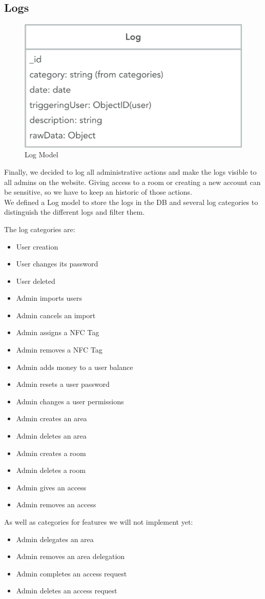\documentclass[11pt,a4paper]{report}
\begin{document}
\subsection{Logs}
\begin{figure}[H]
\begin{center}
	\includegraphics[width=.6\textwidth]{assets/log_model}
	\caption{Log Model}
\end{center}
\end{figure}
Finally, we decided to log all administrative actions and make the logs visible to all admins on the website. Giving access to a room or creating a new account can be sensitive, so we have to keep an historic of those actions.\\

We defined a Log model to store the logs in the DB and several log categories to distinguish the different logs and filter them.

The log categories are:
\begin{itemize}
\item User creation
\item User changes its password
\item User deleted
\item Admin imports users
\item Admin cancels an import
\item Admin assigns a NFC Tag
\item Admin removes a NFC Tag
\item Admin adds money to a user balance
\item Admin resets a user password
\item Admin changes a user permissions
\item Admin creates an area
\item Admin deletes an area
\item Admin creates a room
\item Admin deletes a room
\item Admin gives an access
\item Admin removes an access
\end{itemize}
As well as categories for features we will not implement yet:
\begin{itemize}
\item Admin delegates an area
\item Admin removes an area delegation
\item Admin completes an access request
\item Admin deletes an access request
\end{itemize}
\end{document}
